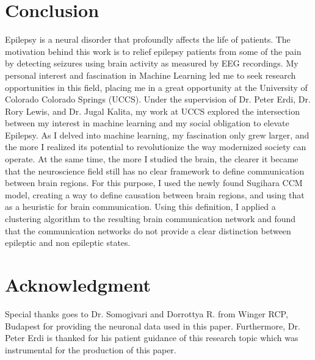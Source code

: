\documentclass[journal,12pt,onecolumn,draftclsnofoot]{IEEEtran}  %
\begin{document}
\section{Conclusion}
Epilepsy is a neural disorder that profoundly affects the life of patients. The motivation behind this work is to relief epilepsy patients from some of the pain by detecting seizures using brain activity as measured by EEG recordings. My personal interest and fascination in Machine Learning led me to seek research opportunities in this field, placing me in a great opportunity at the University of Colorado Colorado Springs (UCCS). Under the supervision of Dr. Peter Erdi, Dr. Rory Lewis, and Dr. Jugal Kalita, my work at UCCS explored the intersection between my interest in machine learning and my social obligation to elevate Epilepsy. As I delved into machine learning, my fascination only grew larger, and the more I realized its potential to revolutionize the way modernized society can operate. At the same time, the more I studied the brain, the clearer it became that the neuroscience field still has no clear framework to define communication between brain regions. For this purpose, I used the newly found Sugihara CCM model, creating a way to define causation between brain regions, and using that as a heuristic for brain communication. Using this definition, I applied a clustering algorithm to the resulting brain communication network and found that the communication networks do not provide a clear distinction between epileptic and non epileptic states.

\section*{Acknowledgment}

Special thanks goes to Dr. Somogivari and Dorrottya R. from Winger RCP, Budapest for providing the neuronal data used in this paper. Furthermore, Dr. Peter Erdi is thanked for his patient guidance of this research topic which was instrumental for the production of this paper.

\balance


\end{document}

